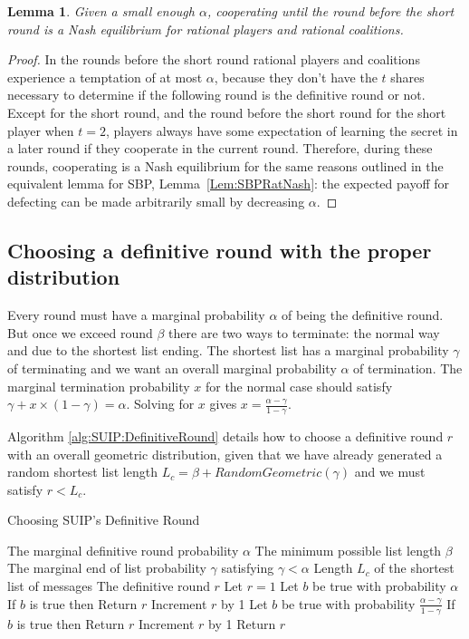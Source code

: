 \documentclass[12pt]{dalcsthesis}
\newtheorem{lemma}{Lemma}
\begin{document}
\begin{lemma}\label{Lem:SUIP:RatNashCoop}Given a small enough $\alpha$, cooperating until the round before the short round is a Nash equilibrium for rational players and rational coalitions.\end{lemma}
\begin{proof}
In the rounds before the short round rational players and coalitions experience a temptation of at most $\alpha$, because they don't have the $t$ shares necessary to determine if the following round is the definitive round or not. Except for the short round, and the round before the short round for the short player when $t=2$, players always have some expectation of learning the secret in a later round if they cooperate in the current round. Therefore, during these rounds, cooperating is a Nash equilibrium for the same reasons outlined in the equivalent lemma for SBP, Lemma~\ref{Lem:SBPRatNash}: the expected payoff for defecting can be made arbitrarily small by decreasing $\alpha$.
\end{proof}

\subsection{Choosing a definitive round with the proper distribution}
\label{Sec:SUIP:ChooseRound}

Every round must have a marginal probability $\alpha$ of being the definitive round. But once we exceed round $\beta$ there are two ways to terminate: the normal way and due to the shortest list ending. The shortest list has a marginal probability $\gamma$ of terminating and we want an overall marginal probability $\alpha$ of termination. The marginal termination probability $x$ for the normal case should satisfy $\gamma + x \times (1 - \gamma) = \alpha$. Solving for $x$ gives $x = \frac{\alpha - \gamma}{1 - \gamma}$.

Algorithm \ref{alg:SUIP:DefinitiveRound} details how to choose a definitive round $r$ with an overall geometric distribution, given that we have already generated a random shortest list length $L_c = \beta + RandomGeometric(\gamma)$ and we must satisfy $r < L_c$.

\begin{algorithm}
  \caption{Choosing SUIP's Definitive Round}
  \label{alg:SUIP:DefinitiveRound}
  \begin{algorithmic}
    \INPUT The marginal definitive round probability $\alpha$ 
    \INPUT The minimum possible list length $\beta$
    \INPUT The marginal end of list probability $\gamma$ satisfying $\gamma < \alpha$
    \INPUT Length $L_c$ of the shortest list of messages
    \OUTPUT The definitive round $r$
    \STATE Let $r = 1$
      \STATE Let $b$ be true with probability $\alpha$
      \STATE If $b$ is true then Return $r$
      \STATE Increment $r$ by 1 
    \ENDWHILE
      \STATE Let $b$ be true with probability $\frac{\alpha - \gamma}{1 - \gamma}$
      \STATE If $b$ is true then Return $r$
      \STATE Increment $r$ by 1
    \ENDWHILE
    \STATE Return $r$
  \end{algorithmic}
\end{algorithm}
\end{document}
